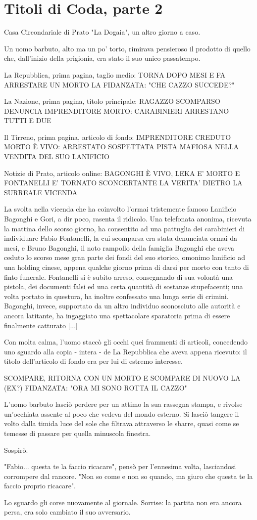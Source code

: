 \chapter{Titoli di Coda, parte 2}

Casa Circondariale di Prato "La Dogaia", un altro giorno a caso.

Un uomo barbuto, alto ma un po' torto, rimirava pensieroso il prodotto di quello che, dall'inizio della prigionia, era stato il suo unico passatempo.

La Repubblica, prima pagina, taglio medio:
TORNA DOPO MESI E FA ARRESTARE UN MORTO
LA FIDANZATA: "CHE CAZZO SUCCEDE?"

La Nazione, prima pagina, titolo principale:
RAGAZZO SCOMPARSO DENUNCIA IMPRENDITORE MORTO: 
CARABINIERI ARRESTANO TUTTI E DUE

Il Tirreno, prima pagina, articolo di fondo:
IMPRENDITORE CREDUTO MORTO È VIVO: ARRESTATO
SOSPETTATA PISTA MAFIOSA NELLA VENDITA DEL SUO LANIFICIO

Notizie di Prato, articolo online:
BAGONGHI È VIVO, LEKA E' MORTO E FONTANELLI E' TORNATO
SCONCERTANTE LA VERITA' DIETRO LA SURREALE VICENDA

La svolta nella vicenda che ha coinvolto l'ormai tristemente famoso Lanificio Bagonghi e Gori, a dir poco, rasenta il ridicolo. Una telefonata anonima, ricevuta la mattina dello scorso giorno, ha consentito ad una pattuglia dei carabinieri di individuare Fabio Fontanelli, la cui scomparsa era stata denunciata ormai da mesi, e Bruno Bagonghi, il noto rampollo della famiglia Bagonghi che aveva ceduto lo scorso mese gran parte dei fondi del suo storico, omonimo lanificio ad una holding cinese, appena qualche giorno prima di darsi per morto con tanto di finto funerale. Fontanelli si è subito arreso, consegnando di sua volontà una pistola, dei documenti falsi ed una certa quantità di sostanze stupefacenti; una volta portato in questura, ha inoltre confessato una lunga serie di crimini. Bagonghi, invece, supportato da un altro individuo sconosciuto alle autorità e ancora latitante, ha ingaggiato una spettacolare sparatoria prima di essere finalmente catturato [...]

Con molta calma, l'uomo staccò gli occhi quei frammenti di articoli, concedendo uno sguardo alla copia - intera - de La Repubblica che aveva appena ricevuto: il titolo dell'articolo di fondo era per lui di estremo interesse.

SCOMPARE, RITORNA CON UN MORTO E SCOMPARE DI NUOVO
LA (EX?) FIDANZATA: "ORA MI SONO ROTTA IL CAZZO"

L'uomo barbuto lasciò perdere per un attimo la sua rassegna stampa, e rivolse un'occhiata assente al poco che vedeva del mondo esterno. Si lasciò tangere il volto dalla timida luce del sole che filtrava attraverso le sbarre, quasi come se temesse di passare per quella minuscola finestra. 

Sospirò.

"Fabio... questa te la faccio ricacare", pensò per l'ennesima volta, lasciandosi corrompere dal rancore. "Non so come e non so quando, ma giuro che questa te la faccio proprio ricacare".

Lo sguardo gli corse nuovamente al giornale. Sorrise: la partita non era ancora persa, era solo cambiato il suo avversario.
